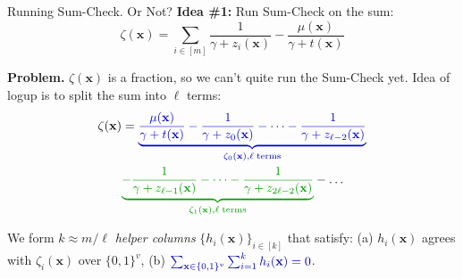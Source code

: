 \documentclass{zkdl-presentation-template}
\begin{document}
    \begin{frame}{Running Sum-Check. Or Not?}
        \textbf{Idea \#1:} Run Sum-Check on the sum:
        \begin{equation*}
            \zeta(\mathbf{x}) = \sum_{i \in [m]} \frac{1}{\gamma + z_i(\mathbf{x})} - \frac{\mu(\mathbf{x})}{\gamma+t(\mathbf{x})}
        \end{equation*}

        \vspace{-15px}

        \pause\textcolor{red!70!black}{\textbf{Problem.}} $\zeta(\mathbf{x})$ is
        a fraction, so we can't quite run the Sum-Check yet. \pause \hspace{0.5px} Idea of logup is to
        split the sum into $\ell$ terms:
        \begin{align*}
            \zeta(\mathbf{x}) &= \textcolor{blue!80!black}{\underbrace{\frac{\mu(\mathbf{x})}{\gamma+t(\mathbf{x})} - \frac{1}{\gamma+z_0(\mathbf{x})} - \dots - \frac{1}{\gamma+z_{\ell-2}(\mathbf{x})}}_{\zeta_0(\mathbf{x}), \ell \; \text{terms}}}\\
            & \textcolor{green!60!black}{\underbrace{- \frac{1}{\gamma+z_{\ell-1}(\mathbf{x})} - \dots - \frac{1}{\gamma + z_{2\ell-2}(\mathbf{x})}}_{\zeta_1(\mathbf{x}), \ell \; \text{terms}}} - \dots 
        \end{align*}

        \vspace{-15px}

        \pause We form $k \approx m/\ell$ \textit{helper columns}
        $\{h_i(\mathbf{x})\}_{i \in [k]}$ that satisfy: (a) $h_i(\mathbf{x})$
        agrees with $\zeta_i(\mathbf{x})$ over $\{0,1\}^v$, (b)
        $\textcolor{blue!70!black}{\sum_{\mathbf{x} \in \{0,1\}^v}\sum_{i=1}^k h_i(\mathbf{x}) = 0}$.
    \end{frame}
\end{document}
